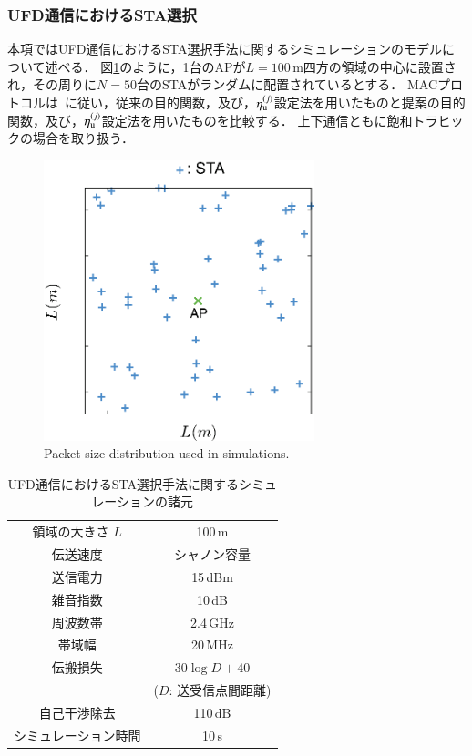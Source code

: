 \documentclass[master]{kuisthesis}		%
\newcommand{\etau}{\eta_{\rm u}^{(j)}}
\begin{document}
		\subsubsection{UFD通信におけるSTA選択}
			本項ではUFD通信におけるSTA選択手法に関するシミュレーションのモデルについて述べる．
			図\ref{fig:pos}のように，1台のAPが$L=100$\,m四方の領域の中心に設置され，その周りに$N=50$台のSTAがランダムに配置されているとする．
			MACプロトコルは~\cite{promac}に従い，従来の目的関数，及び，$\etau$設定法を用いたものと提案の目的関数，及び，$\etau$設定法を用いたものを比較する．
			上下通信ともに飽和トラヒックの場合を取り扱う．

			\begin{figure}[t]
				\begin{center}
					\includegraphics[width=0.7\textwidth]{fig/pos.eps}
					\caption{Packet size distribution used in simulations.}
					\label{fig:pos}
				\end{center}
			\end{figure}

			\begin{table}[t]
				\centering
				\caption{UFD通信におけるSTA選択手法に関するシミュレーションの諸元}
				\label{tab:param}
				\begin{tabular}{cc} \hline
					領域の大きさ $L$ & 100\,m \\
					伝送速度 & シャノン容量 \\
					送信電力 & 15\,dBm \\
					雑音指数 & 10\,dB \\
					周波数帯 & 2.4\,GHz \\
					帯域幅 & 20\,MHz \\
					伝搬損失 & $30\log D + 40$\\
					&($D$: 送受信点間距離)\\
					自己干渉除去 & 110\,dB \\
					シミュレーション時間 & 10\,s \\\hline
				\end{tabular}
			\end{table}
\end{document}
